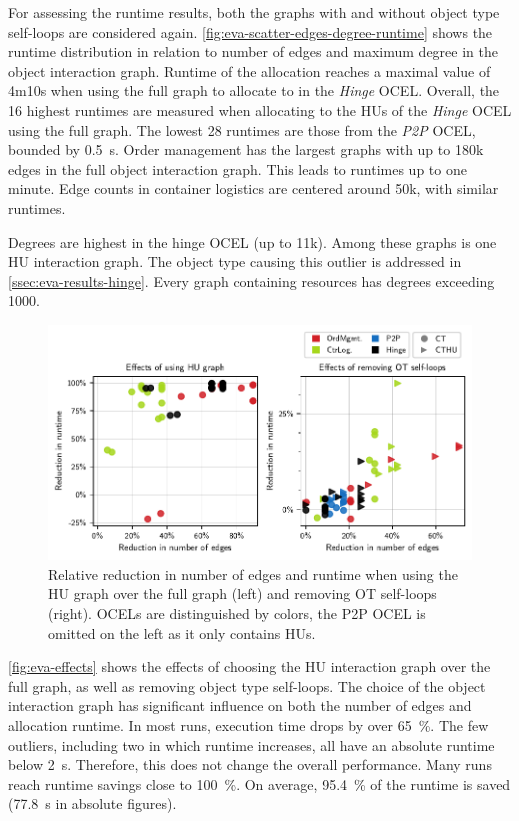 For assessing the runtime results, both the graphs with and without object type self-loops are considered again.
\autoref{fig:eva-scatter-edges-degree-runtime}
shows the runtime distribution in relation to number of edges and maximum degree in the object interaction graph.
Runtime of the  allocation reaches a maximal value of 4m10s when using the full graph to allocate to  in the \textit{Hinge} OCEL.
Overall, the 16 highest runtimes are measured when allocating to the HUs of the \textit{Hinge} OCEL using the full graph. The lowest 28 runtimes are those from the \textit{P2P} OCEL, bounded by \qty{0.5}{\second}.
Order management has the largest graphs with up to 180k edges in the full object interaction graph. This leads to runtimes up to one minute.
Edge counts in container logistics are centered around 50k, with similar runtimes.

Degrees are highest in the hinge OCEL (up to 11k).
Among these graphs is one HU interaction graph. The object type causing this outlier is addressed in \autoref{ssec:eva-results-hinge}.
Every graph containing resources has degrees exceeding 1000.

\begin{figure}[t]
  \centering
  \includegraphics[width=\textwidth]{figures/20240910-180848-eva-scatter-both-effects-f7e4b0e7.pdf}
  \caption{Relative reduction in number of edges and runtime when using the HU graph over the full graph (left) and removing OT self-loops (right). OCELs are distinguished by colors, the P2P OCEL is omitted on the left as it only contains HUs.}
  \label{fig:eva-effects}
\end{figure}

\autoref{fig:eva-effects} shows the effects of choosing the HU interaction graph over the full graph, as well as removing object type self-loops.
The choice of the object interaction graph has significant influence on both the number of edges and allocation runtime.
In most runs, execution time drops by over \qty{65}{\percent}. The few outliers, including two in which runtime increases, all have an absolute runtime below \qty{2}{\second}. Therefore, this does not change the overall performance.
Many runs reach runtime savings close to \qty{100}{\percent}. On average, \qty{95.4}{\percent} of the runtime is saved (\qty{77.8}{\second} in absolute figures).


